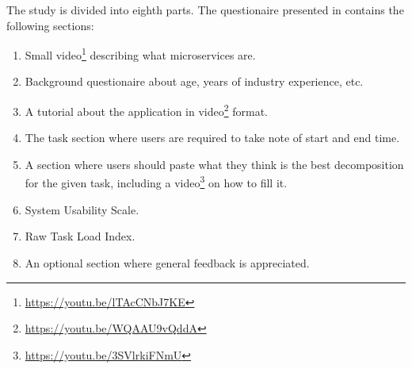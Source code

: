 The study is divided into eighth parts. The questionaire presented in
 contains the following sections:

\begin{enumerate}[1.]
  \item Small video\footnote{\url{https://youtu.be/lTAcCNbJ7KE}} describing
    what microservices are.
  \item Background questionaire about age, years of industry experience, etc.
  \item A tutorial about the application in
    video\footnote{\url{https://youtu.be/WQAAU9vQddA}} format.
  \item The task section where users are required to take note of start and end
    time. 
  \item A section where users should paste what they think is the best
    decomposition for the given task, including a
    video\footnote{\url{https://youtu.be/3SVlrkiFNmU}} on how to fill it.
  \item System Usability Scale. 
  \item Raw Task Load Index. 
  \item An optional section where general feedback is appreciated.
\end{enumerate}
